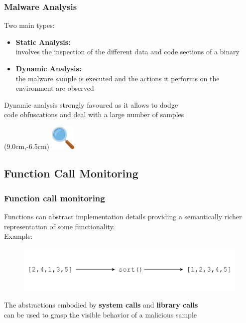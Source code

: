 \documentclass[compress]{beamer}
\begin{document}
\begin{frame}
    \frametitle{Malware Analysis}

    Two main types:
    \medskip
    \begin{itemize}
        \item \textbf{Static Analysis:}\\
        involves the inspection of the different data and code sections of a binary
        \item \textbf{Dynamic Analysis:}\\
        the malware sample is executed and the actions it performs on the environment are observed
    \end{itemize}
    \vspace{1cm}    
        
         \begin{beamerboxesrounded}[shadow=true]{}
    Dynamic analysis strongly favoured as it allows to dodge \\ code obfuscations and deal with a large number of samples
    \end{beamerboxesrounded}    

    \begin{textblock*}{2cm}(9.0cm,-6.5cm)
   \includegraphics[width=1.2cm]{image/search.png}%
	\end{textblock*} 

\end{frame}

\subsection{Function Call Monitoring}
\begin{frame}
    \frametitle{Function call monitoring}

Functions can abstract
implementation details providing
a semantically richer representation of some functionality. \\\bigskip
Example:
    \begin{figure}
    	\vspace{-0.4cm}
        \includegraphics[scale=0.6]{image/fcmonitoring}
    \end{figure}

\begin{beamerboxesrounded}[shadow=true]{}
The abstractions embodied by \textbf{system calls} and \textbf{library calls} \\ can be used to grasp the visible behavior of a malicious sample
\end{beamerboxesrounded} 

\end{frame}
\end{document}

